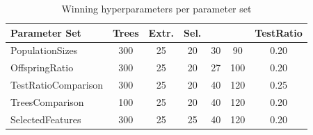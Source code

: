 \begin{table}[ht]\centering
\caption{Winning hyperparameters per parameter set}\label{tab:best_hyper}
\begin{tabular}{l S[table-format=3.0] S[table-format=2.0] S[table-format=2.0] S[table-format=3.0] S[table-format=3.0] S[table-format=1.2]}
\toprule
\textbf{Parameter Set} & \textbf{Trees} & \textbf{Extr.} & \textbf{Sel.} & \boldmath{$\mu$} & \boldmath{$\lambda$} & \textbf{TestRatio} \\
\midrule
PopulationSizes & 300 & 25 & 20 & 30 & 90 & 0.20 \\
OffspringRatio & 300 & 25 & 20 & 27 & 100 & 0.20 \\
TestRatioComparison & 300 & 25 & 20 & 40 & 120 & 0.25 \\
TreesComparison & 100 & 25 & 20 & 40 & 120 & 0.20 \\
SelectedFeatures & 300 & 25 & 25 & 40 & 120 & 0.20 \\
\bottomrule\end{tabular}\end{table}
